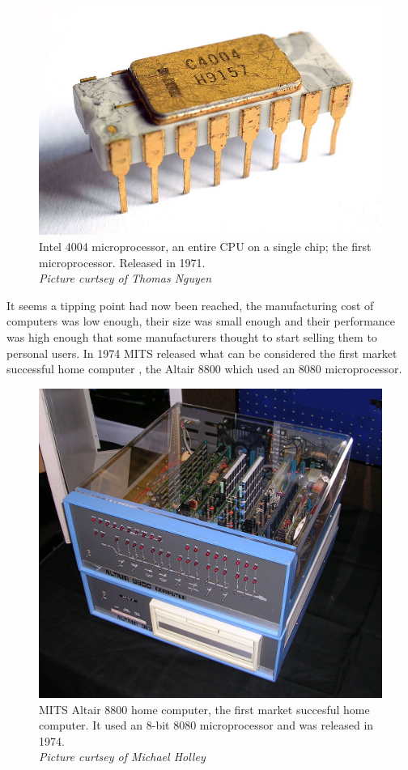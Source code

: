 \begin{figure} \begin{center}
\includegraphics[width=.3\linewidth]{pics/intel_4004} 
\end{center} 
\caption{Intel 4004 microprocessor, an entire CPU on a single chip; the first microprocessor. Released in 1971.\\ \textit{\small{Picture curtsey of Thomas Nguyen}}}
\end{figure} 


It seems a tipping point had now been reached, the manufacturing cost of computers was low enough, their size was small enough and their performance was high enough that some manufacturers thought to start selling them to personal users. In 1974 MITS released what can be considered the first market successful home computer \cite{Dorf95}, the Altair 8800 which used an 8080 microprocessor. \\

\begin{figure} \begin{center}
\includegraphics[width=.3\linewidth]{pics/altair_8800_computer} 
\end{center} 
\caption{MITS Altair 8800 home computer, the first market succesful home computer. It used an 8-bit 8080 microprocessor and was released in 1974.\\ \textit{\small{Picture curtsey of  Michael Holley}}}
\end{figure}

